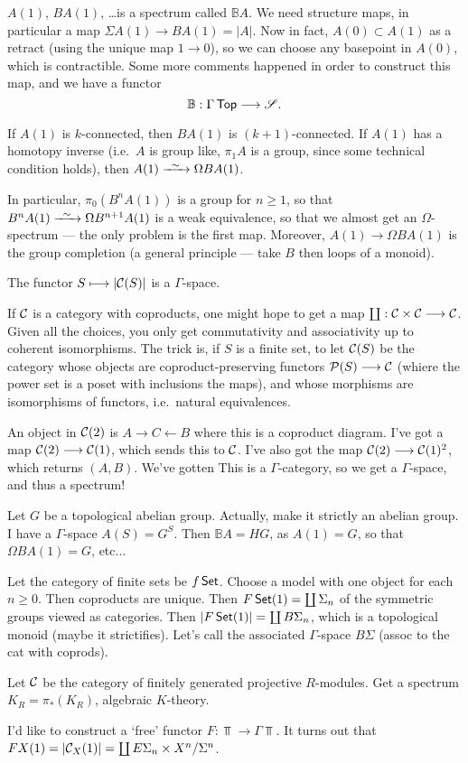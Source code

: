 \documentclass[11pt]{article}
\begin{document}
\begin{JandrGammaSpaces}
$A(1)$, $BA(1)$, \ldots is a spectrum called $\mathbb{B}A$. We need structure maps, in particular a map $\Sigma A(1)\to BA(1)=|A|$. Now in fact, $A(0)\subset A(1)$ as a retract (using the unique map $1\to 0$), so we can choose any basepoint in $A(0)$, which is contractible. Some more comments happened in order to construct this map, and we have a functor
\[\mathbb{B}:\Gamma\operatorname{{\mathsf{Top}}}\longrightarrow\mathscr{S}.\]
\begin{prop*}
If $A(1)$ is $k$-connected, then $BA(1)$ is $(k+1)$-connected. If $A(1)$ has a homotopy inverse (i.e.\ $A$ is group like, \Iff $\pi_1A$ is a group, since some technical condition holds), then $A(1)\weakequiv \Omega BA(1)$.
\end{prop*}
\noindent In particular, $\pi_0(B^nA(1))$ is a group for $n\geq1$, so that $B^nA(1)\weakequiv \Omega B^{n+1}A(1)$ is a weak equivalence, so that we almost get an $\Omega$-spectrum --- the only problem is the first map. Moreover, $A(1)\to\Omega BA(1)$ is the group completion (a general principle --- take $B$ then loops of a monoid).

\begin{cor*}
The functor $S\longmapsto|\mathcal{C}(S)|$ is a $\Gamma$-space.
\end{cor*}
If $\mathcal{C}$ is a category with coproducts, one might hope to get a map $\coprod:\mathcal{C}\times\mathcal{C}\longrightarrow\mathcal{C}$. Given all the choices, you only get commutativity and associativity up to coherent isomorphisms. The trick is, if $S$ is a finite set, to let $\mathcal{C}(S)$ be the category whose objects are coproduct-preserving functors $\mathcal{P}(S)\longrightarrow\mathcal{C}$ (whiere the power set is a poset with inclusions the maps), and whose morphisms are isomorphisms of functors, i.e.\ natural equivalences.

An object in $\mathcal{C}(2)$ is $A\rightarrow C\leftarrow B$ where this is a coproduct diagram. I've got a map $\mathcal{C}(2)\longrightarrow \mathcal{C}(1)$, which sends this to $\mathcal{C}$. I've also got the map $\mathcal{C}(2)\longrightarrow\mathcal{C}(1)^2$, which returns $(A,B)$. We've gotten
This is a $\Gamma$-category, so we get a $\Gamma$-space, and thus a spectrum!
\begin{exmp*}
Let $G$ be a topological abelian group. Actually, make it strictly an abelian group. I have a $\Gamma$-space $A(S)=G^S$. Then $\mathbb{B}A=HG$, as $A(1)=G$, so that $\Omega BA(1)=G$, etc...
\end{exmp*}
\begin{exmp*}
Let the category of finite sets be $f\operatorname{{\mathsf{Set}}}$.
Choose a model with one object for each $n\geq0$. Then coproducts are unique. Then $F\operatorname{{\mathsf{Set}}}(1)=\coprod\Sigma_n$ of the symmetric groups viewed as categories. Then $|F\operatorname{{\mathsf{Set}}}(1)|=\coprod  B\Sigma_n$, which is a topological monoid (maybe it strictifies). Let's call the associated $\Gamma$-space $B\Sigma$ (assoc to the cat with coprods). 
\end{exmp*}
\begin{exmp*}
Let $\mathcal{C}$ be the category of finitely generated projective $R$-modules. Get a spectrum $K_R=\pi_*(K_R)$, algebraic $K$-theory.
\end{exmp*}
I'd like to construct a `free' functor $F:\Top\to\Gamma\Top$. It turns out that $FX(1)=|\mathcal{C}_X(1)|=\coprod E\Sigma_n\times X^n/\Sigma^n$.


\end{JandrGammaSpaces}
\end{document}
